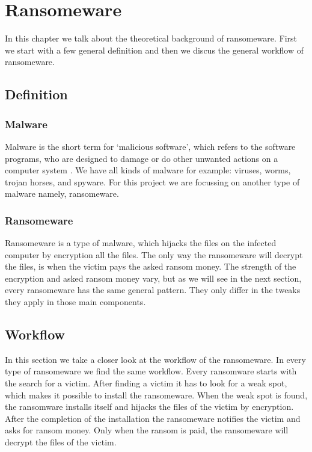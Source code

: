 \chapter{Ransomeware}\label{Ransomeware}

In this chapter we talk about the theoretical background of ransomeware.
First we start with a few general definition and then we discus the general workflow of ransomeware.


\section{Definition}\label{Definition}

\subsection{Malware}

Malware is the short term for `malicious software', which refers to the software programs, who are designed to damage or do other unwanted actions on a computer system \cite{malware}. We have all kinds of malware for example: viruses, worms, trojan horses, and spyware. For this project we are focussing on another type of malware namely, ransomeware.

\subsection{Ransomeware}

Ransomeware is a type of malware, which hijacks the files on the infected computer by encryption all the files. The only way the ransomeware will decrypt the files, is when the victim pays the asked ransom money. The strength of the encryption and asked ransom money vary, but as we will see in the next section, every ransomeware has the same general pattern. They only differ in the tweaks they apply in those main components.

\section{Workflow}\label{workflow}

In this section we take a closer look at the workflow of the ransomeware. In every type of ransomeware we find the same workflow. Every ransomware starts with the search for a victim. After finding a victim it has to look for a weak spot, which makes it possible to install the ransomeware. When the weak spot is found, the ransomware installs itself and hijacks the files of the victim by encryption. After the completion of the installation the ransomeware notifies the victim and asks for ransom money. Only when the ransom is paid, the ransomeware will decrypt the files of the victim.

